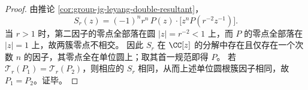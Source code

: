 \begin{proof}
由推论 \ref{cor:group-jg-leyang-double-resultant}，
\[
S_r(z)=(-1)^n r^n\,P(z)\cdot \bigl[z^nP(r^{-2}z^{-1})\bigr].
\]
当 \(r>1\) 时，第二因子的零点全部落在圆 \(|z|=r^{-2}<1\) 上，而 \(P\) 的零点全部落在 \(|z|=1\) 上，故两簇零点不相交。
因此 \(S_r\) 在 \(\CC[z]\) 的分解中存在且仅存在一个次数 \(n\) 的因子，其零点全在单位圆上；取其首一规范即得 \(P\)。
若 \(\mathcal{T}_r(P_1)=\mathcal{T}_r(P_2)\)，则相应的 \(S_r\) 相同，从而上述单位圆根簇因子相同，故 \(P_1=P_2\)。证毕。
\end{proof}
